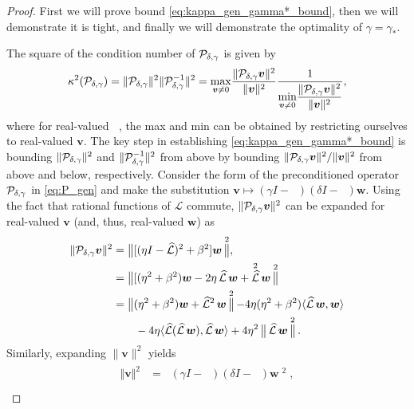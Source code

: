 \documentclass[a4paper,10pt]{article}
\DeclareMathOperator{\cL}{\widehat{\mathcal{L}}}
\DeclareMathOperator{\cLs}{\widehat{\mathcal{L}}^2}
\DeclareMathOperator{\bVert}{\big\Vert}
\begin{document}
\begin{proof}
First we will prove bound \eqref{eq:kappa_gen_gamma*_bound}, then we will demonstrate it is tight, and finally we will demonstrate the optimality of $\gamma=\gamma_*$.

The square of the condition number of ${\cal P}_{\delta, \gamma}$ is given by
%
\begin{align}
\label{eq:kappa_gen_def}
\kappa^2({\cal P}_{\delta,\gamma}) 
= 
\Vert {\cal P}_{\delta,\gamma} \Vert^2 
\Vert {\cal P}_{\delta,\gamma}^{-1} \Vert^2
=
\underset{{\bm{v} \neq 0}}{\max} \frac{\Vert {\cal P}_{\delta,\gamma} \bm{v} \Vert^2 }{\Vert \bm{v} \Vert^2} 
\frac{1}{\displaystyle{\underset{{\bm{v} \neq 0}}{\min} \frac{\Vert {\cal P}_{\delta,\gamma} \bm{v} \Vert^2 }{\Vert \bm{v} \Vert^2}}},
\end{align}
%
where for real-valued $\cL$, the max and min can be obtained by restricting ourselves
to real-valued $\bm{v}$. The key step in establishing \eqref{eq:kappa_gen_gamma*_bound} is bounding
$\Vert {\cal P}_{\delta,\gamma} \Vert^2$ and $\Vert {\cal P}_{\delta,\gamma}^{-1} \Vert^2$ from above
by bounding $\Vert {\cal P}_{\delta,\gamma} \bm{v} \Vert^2 / \Vert \bm{v} \Vert^2$
from above and below, respectively.
%
Consider the form of the preconditioned operator ${\cal P}_{\delta,\gamma}$ in
\eqref{eq:P_gen} and make the substitution $\bm{v} \mapsto (\gamma I - \cL) (\delta I - \cL) \bm{w}$.
Using the fact that rational functions of $\mathcal{L}$ commute,
$\|{\cal P}_{\delta,\gamma} \bm{v}\|^2$ can be expanded for real-valued
$\bm{v}$ (and, thus, real-valued $\bm{w}$) as
%
\begin{align}
\label{eq:norm_Pv_gen}
\begin{split}
\Vert {\cal P}_{\delta, \gamma} \bm{v} \Vert^2 &= 
	\bVert [( \eta I - \cL)^2 + \beta^2] \bm{w} \bVert^2, \\
& = \bVert [(\eta^2+\beta^2)\bm{w} - 2\eta\cL\bm{w} + \cL^2\bm{w} \bVert^2 \\
&= \bVert (\eta^2 + \beta^2) \bm{w} + \cLs \bm{w} \bVert^2  
	-4 \eta (\eta^2 +\beta^2) \langle \cL \bm{w}, \bm{w} \rangle 
	\\&\quad\quad	
	-4 \eta \langle \cL (\cL \bm{w}), \cL \bm{w} \rangle
	+4 \eta^2 \bVert \cL \bm{w} \bVert^2.
\end{split}
\end{align}
%
Similarly, expanding $\|\bm{v}\|^2$ yields
%
\begin{align}
\label{eq:norm_v_gen}
\begin{split}
\Vert \bm{v} \Vert^2
&= \bVert ( \gamma I - \cL) ( \delta I - \cL) \bm{w} \bVert^2, \\

\end{split}
\end{align}
\end{proof}
\end{document}
